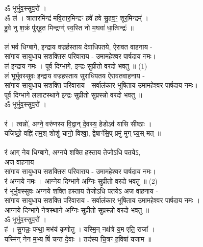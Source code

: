 \subsection{}
ॐ भूर्भुव॒स्सुव॒रों ।\\
ॐ लं । त्रातारमिंन्द्र॑ मवि॒तार॒मिन्द्रꣳ हवे॑ हवे सु॒हव॒ꣳ॒ शूर॒मिन्द्रम्᳚ । \\
हु॒वे नु श॒क्रं पु॑रहू॒त मिन्द्रग्ग्॑ स्व॒स्ति नो॑ म॒घवा॑ धा॒त्विन्द्रः॑ ॥\\
\\
लं भर्व धिग्बागे, इन्द्राय वज्रर्हस्ताय देवाधिपतये, ऐरावत वाहनाय - \\
सांगाय सायुधाय सशक्तिस परिवाराय -  उमामहेश्वर पार्षदाय नमः।\\
लं इन्द्राय नमः ।  पूर्व दिग्भागे, इन्द्रः सुप्रीतो  वरदो भवतु ॥  (1)\\
{\small लं भूर्भुवस्सुवः इन्द्राय वज्रहस्ताय सुराधिपतय ऐरावतवाहनाय -\\
सांगाय सायुधाय सशक्ति परिवाराय - सर्वालंकार भूषिताय उमामहेश्वर पार्षदाय नमः।\\
पूर्व दिग्भागे ललाटस्थाने इन्द्रः सुप्रीतो सुप्रस्न्नो वरदो भवतु ॥}\\
ॐ भूर्भुव॒स्सुव॒रों ।\\
\\
रं । त्वन्नो॑, अग्ने॒ वरु॑णस्य वि॒द्वान् दे॒वस्य॒ हेडोऽव॑ यासि सीष्ठाः ।\\
यजि॑ष्ठो॒  वह्नि॑ तम॒श् शोशु॑ चानो॒ विश्वा॒, द्वेषाꣳ॑सि॒प् प्रमु॑ मुग् घ्य॒स् मत् ॥ \\
\\
रं आग् नेय धिग्बागे, अग्नये शक्ति हस्ताय तेजोऽधि पतयेऽ,\\
\hspace*{10cm} अज वाहनाय\\
सांगाय सायुधाय सशक्तिस परिवाराय - उमामहेश्वर पार्षदाय नमः।\\
रं अग्नये नमः । आग्नेय दिग्भागे अग्निः सुप्रीतो  वरदो भवतु ॥ (2)\\
{\small रं भूर्भुवस्सुवः अग्नये शक्ति हस्ताय तेजोऽधि पतयेऽ अज वाहनाय -\\
सांगाय सायुधाय सशक्ति परिवाराय - सर्वालंकार भूषिताय उमामहेश्वर पार्षदाय नमः ।\\
आग्नये दिग्भागे नेत्रस्थाने अग्निः सुप्रीतो सुप्रस्न्नो वरदो भवतु ॥}\\
ॐ भूर्भुव॒स्सुव॒रों ।\\
हं । सु॒गन्नः॒ पन्था॒ मभ॑यं कृणोतु । यस्मि॒न् नक्ष॑त्रे य॒म एति॒ राजा᳚ ।\\
यस्मि॑न् नेन म॒भ्य षिं॑ चन्त दे॒वाः । तद॑स्य चि॒त्रꣳ ह॒विषा॑ यजाम ॥\\
